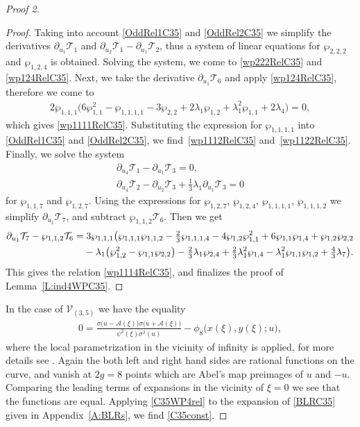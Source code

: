 \documentclass[pdftex]{sigma}
\numberwithin{equation}{section}
\begin{document}
\begin{proof}[Proof 2]
\begin{proof}
Taking into account \eqref{OddRel1C35} and \eqref{OddRel2C35} we simplify the derivatives $\partial_{u_1} \mathcal{T}_1$ and $\partial_{u_2} \mathcal{T}_1 - \partial_{u_1} \mathcal{T}_2$, thus a system of linear equations for $\wp_{2,2,2}$ and $\wp_{1,2,4}$ is obtained. Solving the system, we come to \eqref{wp222RelC35} and \eqref{wp124RelC35}. Next, we take the derivative $\partial_{u_1} \mathcal{T}_6$ and apply \eqref{wp124RelC35}, therefore we come to
\begin{gather*}
 2\wp_{1,1,1} \big(6\wp_{1,1}^2- \wp_{1,1,1,1} - 3\wp_{2,2} + 2\lambda_1 \wp_{1,2} +\lambda_1^2 \wp_{1,1} + 2\lambda_4\big) = 0,
\end{gather*}
which gives \eqref{wp1111RelC35}. Substituting the expression for $\wp_{1,1,1,1}$ into \eqref{OddRel1C35} and \eqref{OddRel2C35}, we find~\eqref{wp1112RelC35} and~\eqref{wp1122RelC35}. Finally, we solve the system
\begin{gather*}
 \partial_{u_4}\mathcal{T}_1 - \partial_{u_1} \mathcal{T}_3 = 0,\\ \partial_{u_4}\mathcal{T}_2 - \partial_{u_2} \mathcal{T}_3 + \tfrac{1}{3} \lambda_1 \partial_{u_1} \mathcal{T}_3 = 0
\end{gather*}
for $\wp_{1,1,7}$ and $\wp_{1,2,7}$. Using the expressions for $\wp_{1,2,7}$, $\wp_{1,2,4}$, $\wp_{1,1,1,1}$, $\wp_{1,1,1,2}$ we simplify $\partial_{u_1} \mathcal{T}_7$, and subtract $\wp_{1,1,2} \mathcal{T}_6$. Then we get
\begin{gather*}
 \partial_{u_1} \mathcal{T}_7 - \wp_{1,1,2} \mathcal{T}_6 = 3\wp_{1,1,1} \big(\wp_{1,1,1}\wp_{1,1,2} - \tfrac{2}{3}\wp_{1,1,1,4} - 4 \wp_{1,2}\wp_{1,1}^2 + 6 \wp_{1,1}\wp_{1,4} + \wp_{1,2}\wp_{2,2} \\
 \hphantom{\partial_{u_1} \mathcal{T}_7 - \wp_{1,1,2} \mathcal{T}_6=}{} - \lambda_1 \big(\wp_{1,2}^2 - \wp_{1,1}\wp_{2,2}\big)
 - \tfrac{2}{3} \lambda_1 \wp_{2,4} + \tfrac{2}{3} \lambda_1^2 \wp_{1,4} - \lambda_1^2 \wp_{1,1}\wp_{1,2} + \tfrac{4}{3} \lambda_7\big).
\end{gather*}
This gives the relation \eqref{wp1114RelC35}, and finalizes the proof of Lemma~\ref{L:ind4WPC35}.
\end{proof}

In the case of $\mathcal{V}_{(3,5)}$ we have the equality
\begin{gather}\label{BLRC35}
 0 = \frac{\sigma\big(u-\mathcal{A}(\xi)\big)\sigma\big(u+\mathcal{A}(\xi)\big)}
 {\psi^2(\xi)\sigma^2(u)} - \phi_{8}\big(x(\xi),y(\xi);u\big),
\end{gather}
where the local parametrization in the vicinity of infinity is applied, for more details see \cite{BL2005}. Again the both left and right hand sides are rational functions on the curve, and vanish at $2g=8$ points which are Abel's map preimages of $u$ and $-u$. Comparing the leading terms of expansions in the vicinity of $\xi=0$ we see that the functions are equal. Applying \eqref{C35WP4rel} to the expansion of \eqref{BLRC35} given in Appendix~\ref{A:BLRs}, we find \eqref{C35const}.
\end{proof}
\end{document}
